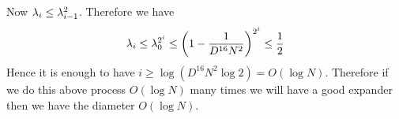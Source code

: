 \documentclass[a4paper, 11pt]{article}
\begin{document}
{Now $\lambda_i\leq \lambda_{i-1}^2$. Therefore we have $$\lambda_i\leq \lambda_0^{2^i}\leq \left( 1-\frac1{D^{16}N^2}  \right)^{2^i}\leq \frac 12$$ Hence it is enough to have $i\geq \log (D^{16}N^2\log 2)=O(\log N)$. Therefore if we do this above process $O(\log N)$ many times we will have a good expander then we have the diameter $O(\log N)$.
}


\end{document}
